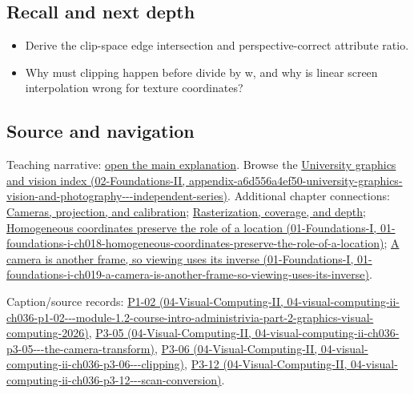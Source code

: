 \subsection{Recall and next depth}\label{appendix-40426e4b2103-recall-and-next-depth}

\begin{itemize}
\tightlist
\item
  Derive the clip-space edge intersection and perspective-correct attribute ratio.
\item
  Why must clipping happen before divide by w, and why is linear screen interpolation wrong for texture coordinates?
\end{itemize}

\subsection{Source and navigation}\label{appendix-40426e4b2103-source-and-navigation}

Teaching narrative: \hyperref[03-visual-computing-i-ch012-rasterization-coverage-and-depth]{open the main explanation}. Browse the \href{../02-Foundations-II/main.pdf\#nameddest=appendix-a6d556a4ef50-university-graphics-vision-and-photography---independent-series}{University graphics and vision index (02-Foundations-II, appendix-a6d556a4ef50-university-graphics-vision-and-photography-\/-\/-independent-series)}. Additional chapter connections: \hyperref[03-visual-computing-i-ch003-cameras-projection-and-calibration]{Cameras, projection, and calibration}; \hyperref[03-visual-computing-i-ch012-rasterization-coverage-and-depth]{Rasterization, coverage, and depth}; \href{../01-Foundations-I/main.pdf\#nameddest=01-foundations-i-ch018-homogeneous-coordinates-preserve-the-role-of-a-location}{Homogeneous coordinates preserve the role of a location (01-Foundations-I, 01-foundations-i-ch018-homogeneous-coordinates-preserve-the-role-of-a-location)}; \href{../01-Foundations-I/main.pdf\#nameddest=01-foundations-i-ch019-a-camera-is-another-frame-so-viewing-uses-its-inverse}{A camera is another frame, so viewing uses its inverse (01-Foundations-I, 01-foundations-i-ch019-a-camera-is-another-frame-so-viewing-uses-its-inverse)}.

Caption/source records: \href{../04-Visual-Computing-II/main.pdf\#nameddest=04-visual-computing-ii-ch036-p1-02---module-1.2-course-intro-administrivia-part-2-graphics-visual-computing-2026}{P1-02 (04-Visual-Computing-II, 04-visual-computing-ii-ch036-p1-02-\/-\/-module-1.2-course-intro-administrivia-part-2-graphics-visual-computing-2026)}, \href{../04-Visual-Computing-II/main.pdf\#nameddest=04-visual-computing-ii-ch036-p3-05---the-camera-transform}{P3-05 (04-Visual-Computing-II, 04-visual-computing-ii-ch036-p3-05-\/-\/-the-camera-transform)}, \href{../04-Visual-Computing-II/main.pdf\#nameddest=04-visual-computing-ii-ch036-p3-06---clipping}{P3-06 (04-Visual-Computing-II, 04-visual-computing-ii-ch036-p3-06-\/-\/-clipping)}, \href{../04-Visual-Computing-II/main.pdf\#nameddest=04-visual-computing-ii-ch036-p3-12---scan-conversion}{P3-12 (04-Visual-Computing-II, 04-visual-computing-ii-ch036-p3-12-\/-\/-scan-conversion)}.

